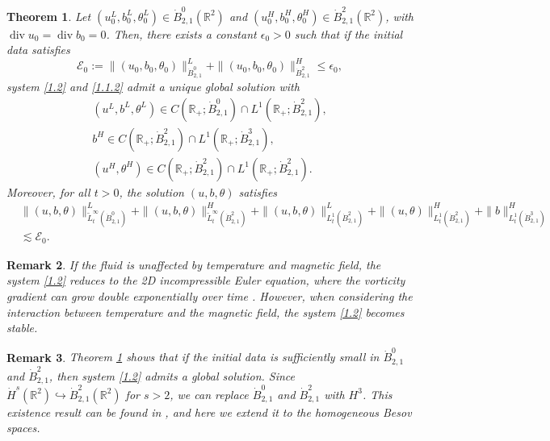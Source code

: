 \documentclass[10pt,a4paper]{amsart}
\numberwithin{equation}{section}
\newtheorem{theorem}{Theorem}[section]
\newtheorem{remark}[theorem]{Remark}
\begin{document}
\begin{theorem} \label{thm1}
Let $(u_0^L, b_0^L, \theta_0^L)\in \dot{B}^0_{2,1}(\mathbb{R}^2)$ and
$(u_0^H, b_0^H, \theta_0^H)\in \dot{B}^2_{2,1}(\mathbb{R}^2)$, with
$\operatorname{div} u_0=\operatorname{div} b_0=0$. Then, there exists a
 constant $\epsilon_0>0$ such that if the initial data satisfies
\begin{equation} \label{1.4}
 \mathcal{E}_0:=\|(u_0,b_0,\theta_0)\|_{\dot{B}^0_{2,1}}^L+\|(u_0,b_0,\theta_0)\|_{\dot{B}^2_{2,1}}^H\leqslant\epsilon_0,
\end{equation}
 system \eqref{1.2} and \eqref{1.1.2} admit a unique global solution with
\begin{equation} \label{1.5}
\begin{gathered}
(u^L,b^L,\theta^L)\in C(\mathbb{R}_+;\dot{B}^0_{2,1})\cap L^1(\mathbb{R}_+;\dot{B}^2_{2,1}),\\
 b^H\in C(\mathbb{R}_+;\dot{B}^2_{2,1})\cap L^1(\mathbb{R}_+;\dot{B}^3_{2,1}), \\
(u^H,\theta^H)\in C(\mathbb{R}_+;\dot{B}^2_{2,1})\cap L^1(\mathbb{R}_+;\dot{B}^2_{2,1}).
\end{gathered}
\end{equation}
Moreover, for all $t > 0$, the solution $(u, b, \theta)$ satisfies
\begin{equation}\label{1.3}
\begin{aligned}
&\|(u,b,\theta)\|_{\tilde{L}^\infty_t(\dot{B}^0_{2,1})}^L
 +\|(u,b,\theta)\|_{\tilde{L}^\infty_t(\dot{B}^2_{2,1})}^H
  +\|(u,b,\theta)\|_{{L}^1_t(\dot{B}^2_{2,1})}^L
 +\|(u,\theta)\|_{{L}^1_t(\dot{B}^2_{2,1})}^H+\|b\|_{{L}^1_t(\dot{B}^3_{2,1})}^H\\
&\lesssim\mathcal{E}_0.
\end{aligned}
\end{equation}
\end{theorem}


\begin{remark} \rm
If the fluid is unaffected by temperature and magnetic field, the system \eqref{1.2} reduces to the
2D incompressible Euler equation, where the vorticity gradient can grow double exponentially over
time \cite{MR3293735,MR3245016,MR3475939}.
However, when considering the interaction between temperature and the magnetic field, the system \eqref{1.2} becomes stable.
\end{remark}


\begin{remark} \rm
Theorem \ref{thm1} shows that if the initial data is sufficiently small in $\dot{B}^0_{2,1}$ and
$\dot{B}^2_{2,1}$, then system \eqref{1.2} admits a global solution.
Since $\dot{H}^s(\mathbb{R}^2)\hookrightarrow\dot{B}^2_{2,1}(\mathbb{R}^2)$ for $s>2$,
we can replace $\dot{B}^0_{2,1}$ and $\dot{B}^2_{2,1}$ with $H^3$.
This existence result can be found in \cite{MR4790886}, and here we extend it to the homogeneous
Besov spaces.
\end{remark}
\end{document}
